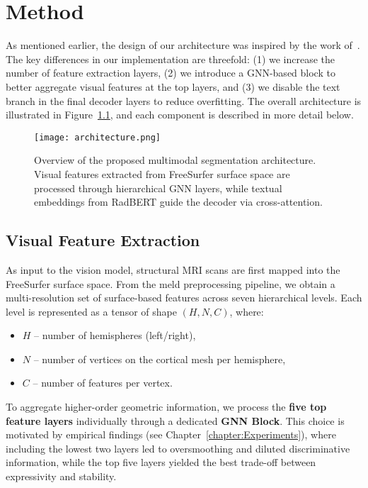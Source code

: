 \documentclass[FCD_GNN.tex]{subfiles}
\begin{document}
\chapter{Method}
\label{chapter:Method}
As mentioned earlier, the design of our architecture was inspired by the work of~\cite{Zhong2023Ariadne}. 
The key differences in our implementation are threefold: 
(1) we increase the number of feature extraction layers, 
(2) we introduce a GNN-based block to better aggregate visual features at the top layers, 
and (3) we disable the text branch in the final decoder layers to reduce overfitting. 
The overall architecture is illustrated in Figure~\ref{fig:architecture}, 
and each component is described in more detail below.

\begin{figure}[htbp]
    \centering
    \texttt{[image: architecture.png]}
    \caption{Overview of the proposed multimodal segmentation architecture. 
    Visual features extracted from FreeSurfer surface space are processed through hierarchical GNN layers, 
    while textual embeddings from RadBERT guide the decoder via cross-attention.}
    \label{fig:architecture}
\end{figure}

\section{Visual Feature Extraction}

As input to the vision model, structural MRI scans are first mapped into the FreeSurfer surface space.  
From the \ac{meld} preprocessing pipeline, we obtain a multi-resolution set of surface-based features across 
seven hierarchical levels. Each level is represented as a tensor of shape $(H, N, C)$, where:  

\begin{itemize}
    \item $H$ – number of hemispheres (left/right),
    \item $N$ – number of vertices on the cortical mesh per hemisphere,
    \item $C$ – number of features per vertex.
\end{itemize}

To aggregate higher-order geometric information, we process the \textbf{five top feature layers} individually through a dedicated \textbf{GNN Block}.  
This choice is motivated by empirical findings (see Chapter~\ref{chapter:Experiments}), where including the lowest two layers led to oversmoothing and diluted 
discriminative information, while the top five layers yielded the best trade-off between expressivity and stability.  
\end{document}
